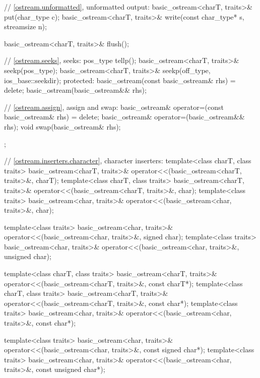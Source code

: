 \begin{codeblock}
{{    // \ref{ostream.unformatted}, unformatted output:
    basic_ostream<charT, traits>& put(char_type c);
    basic_ostream<charT, traits>& write(const char_type* s, streamsize n);

    basic_ostream<charT, traits>& flush();

    // \ref{ostream.seeks}, seeks:
    pos_type tellp();
    basic_ostream<charT, traits>& seekp(pos_type);
    basic_ostream<charT, traits>& seekp(off_type, ios_base::seekdir);
  protected:
    basic_ostream(const basic_ostream& rhs) = delete;
    basic_ostream(basic_ostream&& rhs);

    // \ref{ostream.assign}, assign and swap:
    basic_ostream& operator=(const basic_ostream& rhs) = delete;
    basic_ostream& operator=(basic_ostream&& rhs);
    void swap(basic_ostream& rhs);
  };

  // \ref{ostream.inserters.character}, character inserters:
  template<class charT, class traits>
    basic_ostream<charT, traits>& operator<<(basic_ostream<charT, traits>&,
                                             charT);
  template<class charT, class traits>
    basic_ostream<charT, traits>& operator<<(basic_ostream<charT, traits>&,
                                             char);
  template<class traits>
    basic_ostream<char, traits>& operator<<(basic_ostream<char, traits>&,
                                            char);

  template<class traits>
    basic_ostream<char, traits>& operator<<(basic_ostream<char, traits>&,
                                            signed char);
  template<class traits>
    basic_ostream<char, traits>& operator<<(basic_ostream<char, traits>&,
                                            unsigned char);

  template<class charT, class traits>
    basic_ostream<charT, traits>& operator<<(basic_ostream<charT, traits>&,
                                             const charT*);
  template<class charT, class traits>
    basic_ostream<charT, traits>& operator<<(basic_ostream<charT, traits>&,
                                             const char*);
  template<class traits>
    basic_ostream<char, traits>& operator<<(basic_ostream<char, traits>&,
                                            const char*);

  template<class traits>
    basic_ostream<char, traits>& operator<<(basic_ostream<char, traits>&,
                                            const signed char*);
  template<class traits>
    basic_ostream<char, traits>& operator<<(basic_ostream<char, traits>&,
                                            const unsigned char*);
}
\end{codeblock}


